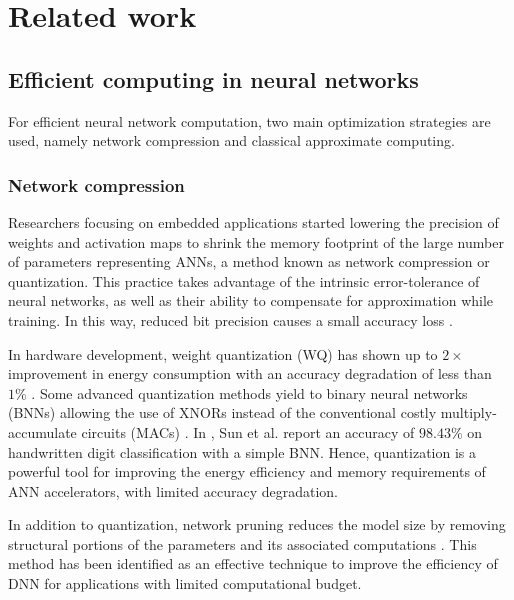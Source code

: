 \section{Related work}
\label{sec:related_work}
\subsection{Efficient computing in neural networks}
For efficient neural network computation, two main optimization strategies are used, namely network compression and classical approximate computing\cite{bouvier2019spiking}.

\subsubsection{Network compression}
Researchers focusing on embedded applications started lowering the precision of weights and activation maps to shrink the memory footprint of the large number of parameters representing ANNs, a method known as network compression or quantization. This practice takes advantage of the intrinsic error-tolerance of neural networks, as well as their ability to compensate for approximation while training. In this way, reduced bit precision causes a small accuracy loss \cite{courbariaux2015binaryconnect, han2015deep, hubara2017quantized, rastegari2016xnor}.

In hardware development, weight quantization (WQ) has shown up to $2\times$ improvement in energy consumption with an accuracy degradation of less than $1\%$ \cite{moons20160, whatmough201714}. Some advanced quantization methods yield to binary neural networks (BNNs) allowing the use of XNORs instead of the conventional costly multiply-accumulate circuits (MACs) \cite{rastegari2016xnor}. In \cite{sun2018xnor}, Sun et al. report an accuracy of $98.43\%$ on handwritten digit classification  with a simple BNN. Hence, quantization is a powerful tool for improving the energy efficiency and memory requirements of ANN accelerators, with limited accuracy degradation.

In addition to quantization, network pruning reduces the model size by removing structural portions of the parameters and its associated computations \cite{lecun1989optimal,hassibi1992second}. This method has been identified as an effective technique to improve the efficiency of DNN for applications with limited computational budget\cite{molchanov2016pruning,li2016pruning, liu2018rethinking}.

